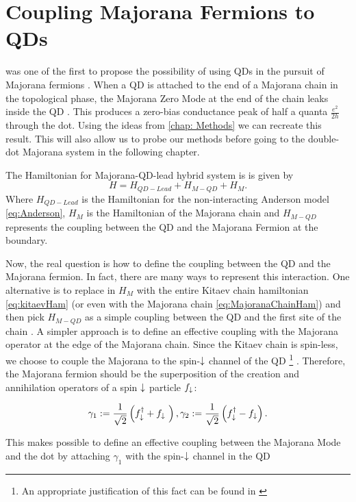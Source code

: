 
\section{Coupling Majorana Fermions to QDs}
\citeauthor{liu_detecting_2011} was one of the first to propose the possibility of using QDs in the pursuit of Majorana fermions . When a QD is attached to the end of a Majorana chain in the topological phase,  the Majorana Zero Mode at the end of the chain leaks inside the QD \cite{vernek_subtle_2014}. This produces a zero-bias conductance peak of half a quanta $\frac{e^{2}}{2h}$ through the dot. Using the ideas from \ref{chap: Methods} we can recreate this result. This will also allow us to probe our methods before going to the double-dot Majorana system in the following chapter. 

The Hamiltonian for Majorana-QD-lead hybrid system is is given by
\begin{equation}
    H=H_{QD-Lead}+H_{M-QD}+H_M.
\end{equation}
Where $H_{QD-Lead}$ is the Hamiltonian for the non-interacting Anderson model \eqref{eq:Anderson}, $H_M$ is the Hamiltonian of the Majorana chain and $H_{M-QD}$ represents the coupling between the QD and the Majorana Fermion at the boundary.

Now, the real question is how to define the coupling between the QD and the Majorana fermion. In fact, there are many ways to represent this interaction. One alternative is to replace in $H_{M}$ with the entire Kitaev chain hamiltonian \eqref{eq:kitaevHam} (or  even with the  Majorana chain \eqref{eq:MajoranaChainHam}) and then pick $H_{M-QD}$ as a simple coupling between the QD and the first site of the chain \cite{vernek_subtle_2014}.  A simpler approach is  to define an effective coupling with the Majorana operator at the edge of the Majorana chain. Since the Kitaev chain is spin-less, we choose to couple the Majorana to the spin-$\downarrow$ channel of the QD \footnote{An appropriate justification of this fact can be found in \cite{ruiz-tijerina_interaction_2015}} . Therefore, the Majorana fermion should be the superposition of the creation and annihilation operators of a spin $\downarrow$ particle $f_\downarrow$:

$$\gamma_1 := \frac{1}{\sqrt{2}} \left( f^\dagger_{\downarrow} + f_{\downarrow}\ \right) , \gamma_2 := \frac{1}{\sqrt{2}} \left( f^\dagger_{\downarrow} - f_{\downarrow} \right).$$

This makes possible to define an effective coupling between the Majorana Mode and the dot by attaching $\gamma_1$ with the spin-$\downarrow$ channel in the QD

